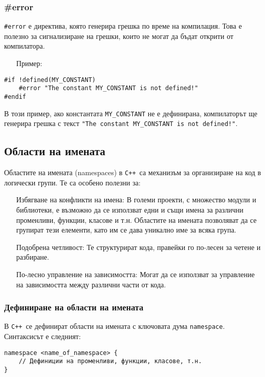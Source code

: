 \documentclass[oneside]{book}
\newcommand*{\code}[1]{\texttt{#1}}
\newcommand*{\cpp}{\texttt{C++}\ }
\begin{document}
\subsubsection{\#error}
\code{\#error} е директива, която генерира грешка по време на компилация. Това е полезно за сигнализиране на грешки, които не могат да бъдат открити от компилатора.

\begin{itemize}\item [Пример:]\end{itemize}
\begin{mdframed}\begin{lstlisting}
#if !defined(MY_CONSTANT)
    #error "The constant MY_CONSTANT is not defined!"
#endif
\end{lstlisting}\end{mdframed}
В този пример, ако константата \code{MY\_CONSTANT} не е дефинирана, компилаторът ще генерира грешка с текст \code{"The constant MY\_CONSTANT is not defined!"}.

\subsection{Области на имената}
Областите на имената (namespaces) в \cpp са механизъм за организиране на код в логически групи. Те са особено полезни за:

\begin{itemize}
    \item[] Избягване на конфликти на имена: В големи проекти, с множество модули и библиотеки, е възможно да се използват едни и същи имена за различни променливи, функции, класове и т.н. Областите на имената позволяват да се групират тези елементи, като им се дава уникално име за всяка група.
    \item[] Подобрена четливост: Те структурират кода, правейки го по-лесен за четене и разбиране.
    \item[] По-лесно управление на зависимостта: Могат да се използват за управление на зависимостта между различни части от кода.
\end{itemize}

\subsubsection{Дефиниране на области на имената}
В \cpp се дефинират области на имената с ключовата дума \code{namespace}. Синтаксисът е следният:

\begin{mdframed}\begin{lstlisting}
namespace <name_of_namespace> {
    // Дефиниции на променливи, функции, класове, т.н.
}
\end{lstlisting}\end{mdframed}
\end{document}
